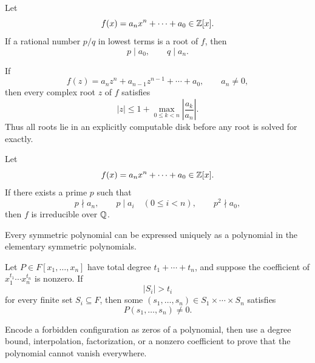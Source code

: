     \begin{theorem}
        Let
        \[
            f(x)=a_nx^n+\cdots+a_0\in\mathbb{Z}[x].
        \]
        If a rational number $p/q$ in lowest terms is a root of $f$, then
        \[
            p\mid a_0,
            \qquad
            q\mid a_n.
        \]
    \end{theorem}


    \begin{theorem}
        If
        \[
            f(z)=a_nz^n+a_{n-1}z^{n-1}+\cdots+a_0,
            \qquad
            a_n\neq0,
        \]
        then every complex root $z$ of $f$ satisfies
        \[
            |z|
            \leq
            1+
            \max_{0\leq k<n}\left|\frac{a_k}{a_n}\right|.
        \]
        Thus all roots lie in an explicitly computable disk before any root is
        solved for exactly.
    \end{theorem}

    \begin{theorem}
        Let
        \[
            f(x)=a_nx^n+\cdots+a_0\in\mathbb{Z}[x].
        \]
        If there exists a prime $p$ such that
        \[
            p\nmid a_n,
            \qquad
            p\mid a_i\quad(0\leq i<n),
            \qquad
            p^2\nmid a_0,
        \]
        then $f$ is irreducible over $\mathbb{Q}$.
    \end{theorem}

    \begin{theorem}
        Every symmetric polynomial can be expressed uniquely as a polynomial in
        the elementary symmetric polynomials.
    \end{theorem}

    \begin{theorem}
        Let $P\in F[x_1,\dots,x_n]$ have total degree
        $t_1+\cdots+t_n$, and suppose the coefficient of
        $x_1^{t_1}\cdots x_n^{t_n}$ is nonzero. If
        \[
            |S_i|>t_i
        \]
        for every finite set $S_i\subseteq F$, then some
        $(s_1,\dots,s_n)\in S_1\times\cdots\times S_n$ satisfies
        \[
            P(s_1,\dots,s_n)\neq0.
        \]
    \end{theorem}

    \begin{strategy}
        Encode a forbidden configuration as zeros of a polynomial, then use a
        degree bound, interpolation, factorization, or a nonzero coefficient to
        prove that the polynomial cannot vanish everywhere.
    \end{strategy}

